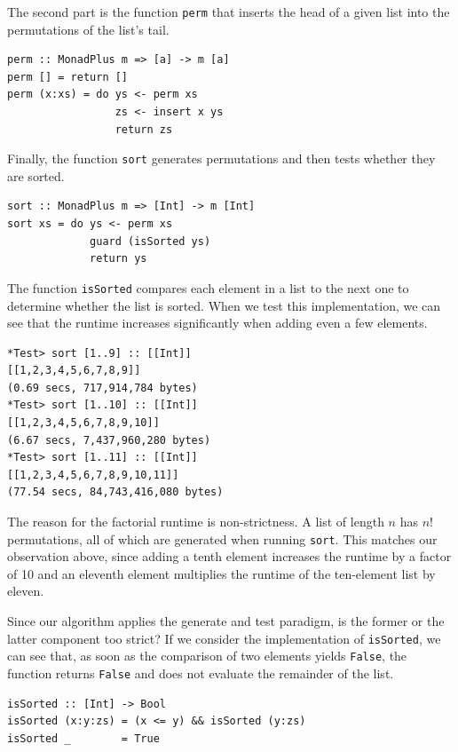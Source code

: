 \documentclass[a4paper, 11pt, fleqn, twoside]{scrreprt}
\begin{document}
The second part is the function \texttt{perm} that inserts the 
head of a given list into the permutations of the list's tail.
\begin{verbatim}
perm :: MonadPlus m => [a] -> m [a]
perm [] = return []
perm (x:xs) = do ys <- perm xs
                 zs <- insert x ys
                 return zs
\end{verbatim}

Finally, the function \texttt{sort} generates permutations and 
then tests whether they are sorted.

\begin{verbatim}
sort :: MonadPlus m => [Int] -> m [Int]
sort xs = do ys <- perm xs
             guard (isSorted ys)
             return ys
\end{verbatim}

The function \texttt{isSorted} compares each element in a list to 
the next one to determine whether the list is sorted. When we test this 
implementation, we can see that the runtime increases significantly when adding 
even a few elements.

\begin{verbatim}
*Test> sort [1..9] :: [[Int]]
[[1,2,3,4,5,6,7,8,9]]
(0.69 secs, 717,914,784 bytes)
*Test> sort [1..10] :: [[Int]]
[[1,2,3,4,5,6,7,8,9,10]]
(6.67 secs, 7,437,960,280 bytes)
*Test> sort [1..11] :: [[Int]]
[[1,2,3,4,5,6,7,8,9,10,11]]
(77.54 secs, 84,743,416,080 bytes)
\end{verbatim}

The reason for the factorial runtime is non-strictness. A list of length $n$ 
has $n!$ permutations, all of which are generated when running 
\texttt{sort}. This matches our observation above, since adding a 
tenth element increases the runtime by a factor of 10 and an eleventh element 
multiplies the runtime of the ten-element list by eleven. 

Since our algorithm applies the generate and test paradigm, is the former or 
the latter component too strict? If we consider the implementation of 
\texttt{isSorted}, we can see that, as soon as the comparison of 
two elements yields \texttt{False}, the function returns 
\texttt{False} and does not evaluate the remainder of the list.

\begin{verbatim}
isSorted :: [Int] -> Bool
isSorted (x:y:zs) = (x <= y) && isSorted (y:zs)
isSorted _        = True
\end{verbatim}
\end{document}
